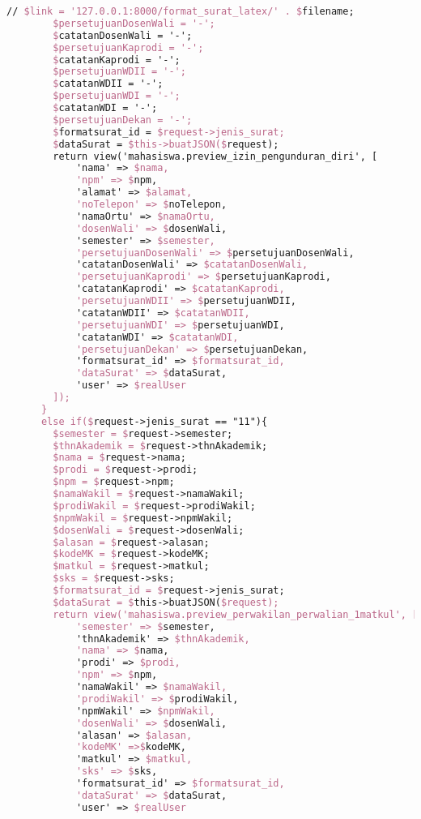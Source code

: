 \begin{lstlisting}[language=tex,basicstyle=\tiny,caption=PesanansuratController.php]
        // $link = '127.0.0.1:8000/format_surat_latex/' . $filename;
        $persetujuanDosenWali = '-';
        $catatanDosenWali = '-';
        $persetujuanKaprodi = '-';
        $catatanKaprodi = '-';
        $persetujuanWDII = '-';
        $catatanWDII = '-';
        $persetujuanWDI = '-';
        $catatanWDI = '-';
        $persetujuanDekan = '-';
        $formatsurat_id = $request->jenis_surat;
        $dataSurat = $this->buatJSON($request);
        return view('mahasiswa.preview_izin_pengunduran_diri', [
            'nama' => $nama,
            'npm' => $npm,
            'alamat' => $alamat,
            'noTelepon' => $noTelepon,
            'namaOrtu' => $namaOrtu,
            'dosenWali' => $dosenWali,
            'semester' => $semester,
            'persetujuanDosenWali' => $persetujuanDosenWali,
            'catatanDosenWali' => $catatanDosenWali,
            'persetujuanKaprodi' => $persetujuanKaprodi,
            'catatanKaprodi' => $catatanKaprodi,
            'persetujuanWDII' => $persetujuanWDII,
            'catatanWDII' => $catatanWDII,
            'persetujuanWDI' => $persetujuanWDI,
            'catatanWDI' => $catatanWDI,
            'persetujuanDekan' => $persetujuanDekan,
            'formatsurat_id' => $formatsurat_id,
            'dataSurat' => $dataSurat,
            'user' => $realUser
        ]);
      }
      else if($request->jenis_surat == "11"){
        $semester = $request->semester;
        $thnAkademik = $request->thnAkademik;
        $nama = $request->nama;
        $prodi = $request->prodi;
        $npm = $request->npm;
        $namaWakil = $request->namaWakil;
        $prodiWakil = $request->prodiWakil;
        $npmWakil = $request->npmWakil;
        $dosenWali = $request->dosenWali;
        $alasan = $request->alasan;
        $kodeMK = $request->kodeMK;
        $matkul = $request->matkul;
        $sks = $request->sks;
        $formatsurat_id = $request->jenis_surat;
        $dataSurat = $this->buatJSON($request);
        return view('mahasiswa.preview_perwakilan_perwalian_1matkul', [
            'semester' => $semester,
            'thnAkademik' => $thnAkademik,
            'nama' => $nama,
            'prodi' => $prodi,
            'npm' => $npm,
            'namaWakil' => $namaWakil,
            'prodiWakil' => $prodiWakil,
            'npmWakil' => $npmWakil,
            'dosenWali' => $dosenWali,
            'alasan' => $alasan,
            'kodeMK' =>$kodeMK,
            'matkul' => $matkul,
            'sks' => $sks,
            'formatsurat_id' => $formatsurat_id,
            'dataSurat' => $dataSurat,
            'user' => $realUser

\end{lstlisting}
